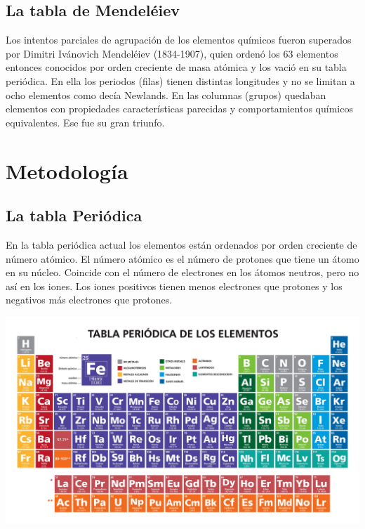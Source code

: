 \documentclass[12pt]{article}
\begin{document}
\begin{multicols}{2}
			\subsection{La tabla de Mendeléiev}
				Los intentos parciales de agrupación de los elementos químicos fueron superados por Dimitri Ivánovich Mendeléiev (1834-1907), quien ordenó los 63 elementos entonces conocidos por orden creciente de masa atómica y los vació en su tabla periódica. En ella los periodos
				(filas) tienen distintas longitudes y no se limitan a ocho elementos como decía Newlands. En las columnas (grupos) quedaban elementos con propiedades características parecidas y comportamientos químicos equivalentes. Ese fue su gran triunfo.
		\section{Metodología}
			\subsection{La tabla Periódica}
				En la tabla periódica actual los elementos están ordenados por orden creciente de número atómico. El número atómico es el número de protones que tiene un átomo en su núcleo. Coincide con el número de electrones en los átomos neutros, pero no así en los iones. Los iones positivos tienen menos electrones que protones y los negativos más electrones que protones.
	\end{multicols}
				\begin{center}
					\includegraphics[scale=0.9]{tabla.jpg}
				\end{center}
\end{document}
